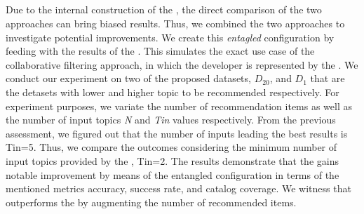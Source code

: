 %

\subsection{\rqsecond} \label{sec:EXP3}



Due to the internal construction of the \MNB, the direct comparison of the two approaches can bring biased results. Thus, we combined the two approaches to investigate potential improvements. We create this \emph{entagled} configuration by feeding \TF with the results of the \MNB. This simulates the exact use case of the collaborative filtering approach, in which the developer is represented by the \MNB. 
We conduct our experiment on two of the proposed datasets, \ie  $D_{20}$, and  $D_{1}$ that are the detasets with lower and higher topic to be recommended respectively.
For experiment purposes, we variate the number of recommendation items as well as the number of input topics \ie \emph{N} and \emph{Tin} values respectively. From the previous assessment, we figured out that the number of inputs leading the best results is Tin=5. Thus, we compare the outcomes considering the minimum number of input topics provided by the \MNB, \ie Tin=2. The results demonstrate that the \MNB gains notable improvement by means of the entangled configuration in terms of the mentioned metrics \ie accuracy, success rate, and catalog coverage. We witness that \TF outperforms the \MNB by augmenting the number of recommended items. 







